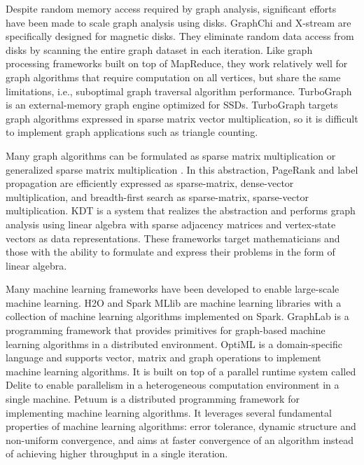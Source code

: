 Despite random memory access required by graph analysis, significant efforts
have been made to scale graph analysis using disks. GraphChi \cite{graphchi}
and X-stream \cite{xstream} are specifically designed for magnetic disks. They
eliminate random data access from disks by scanning the entire graph dataset
in each iteration. Like graph processing frameworks built on top of MapReduce,
they work relatively well for graph algorithms that require computation on all
vertices, but share the same limitations, i.e., suboptimal graph traversal
algorithm performance. TurboGraph \cite{turbograph} is an external-memory graph
engine optimized for SSDs. TurboGraph targets graph algorithms
expressed in sparse matrix vector multiplication, so it is difficult to
implement graph applications such as triangle counting.

Many graph algorithms can be formulated as sparse matrix multiplication or
generalized sparse matrix multiplication \cite{Mattson13, linear_algebra}.
In this abstraction, PageRank and label propagation are efficiently expressed
as sparse-matrix, dense-vector multiplication, and breadth-first search as 
sparse-matrix, sparse-vector multiplication. KDT \cite{kdt} is a system that
realizes the abstraction and performs graph analysis using linear algebra with
sparse adjacency matrices and vertex-state vectors as data representations.
These frameworks target mathematicians and those with the ability to formulate
and express their problems in the form of linear algebra.

Many machine learning frameworks have been developed to enable large-scale
machine learning. H2O \cite{h2o} and Spark MLlib \cite{mllib} are machine
learning libraries with a collection of machine learning algorithms implemented
on Spark. GraphLab \cite{graphlab} is a programming framework that provides
primitives for graph-based machine learning algorithms in a distributed
environment. OptiML \cite{optiml} is a domain-specific language and supports
vector, matrix and graph operations to implement machine learning algorithms.
It is built on top of a parallel runtime system called Delite \cite{delite}
to enable parallelism in a heterogeneous computation environment in a single
machine. Petuum \cite{petuum} is a distributed programming framework for
implementing machine learning algorithms. It leverages several fundamental
properties of machine learning algorithms: error tolerance, dynamic structure
and non-uniform convergence, and aims at faster convergence of
an algorithm instead of achieving higher throughput in a single iteration.
